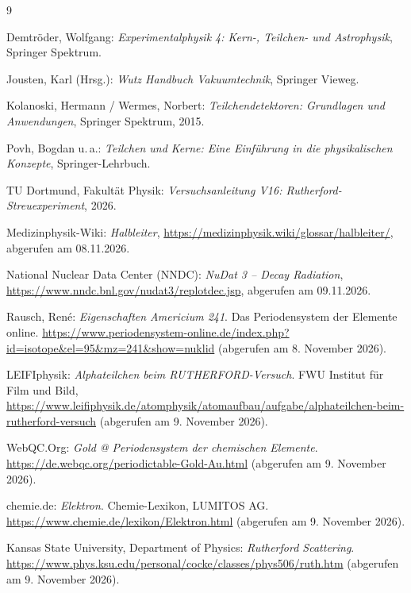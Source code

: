 \newpage

\begin{thebibliography}{9}

Demtröder, Wolfgang: \emph{Experimentalphysik 4: Kern-, Teilchen- und Astrophysik}, Springer Spektrum.

Jousten, Karl (Hrsg.): \emph{Wutz Handbuch Vakuumtechnik}, Springer Vieweg.

Kolanoski, Hermann / Wermes, Norbert: \emph{Teilchendetektoren: Grundlagen und Anwendungen}, Springer Spektrum, 2015.

Povh, Bogdan u.\,a.: \emph{Teilchen und Kerne: Eine Einführung in die physikalischen Konzepte}, Springer-Lehrbuch.

TU Dortmund, Fakultät Physik: \emph{Versuchsanleitung V16: Rutherford-Streuexperiment}, 2026.

Medizinphysik-Wiki: \emph{Halbleiter},
\url{https://medizinphysik.wiki/glossar/halbleiter/},
abgerufen am 08.11.2026.

National Nuclear Data Center (NNDC): \emph{NuDat 3 -- Decay Radiation},
\url{https://www.nndc.bnl.gov/nudat3/replotdec.jsp},
abgerufen am 09.11.2026.

Rausch, René: \emph{Eigenschaften Americium 241}.
Das Periodensystem der Elemente online.
\url{https://www.periodensystem-online.de/index.php?id=isotope&el=95&mz=241&show=nuklid}
(abgerufen am 8. November 2026).

LEIFIphysik: \emph{Alphateilchen beim RUTHERFORD-Versuch}.
FWU Institut für Film und Bild,
\url{https://www.leifiphysik.de/atomphysik/atomaufbau/aufgabe/alphateilchen-beim-rutherford-versuch}
(abgerufen am 9. November 2026).

WebQC.Org: \emph{Gold @ Periodensystem der chemischen Elemente}.
\url{https://de.webqc.org/periodictable-Gold-Au.html}
(abgerufen am 9. November 2026).

chemie.de: \emph{Elektron}. Chemie-Lexikon, LUMITOS AG.
\url{https://www.chemie.de/lexikon/Elektron.html}
(abgerufen am 9. November 2026).

Kansas State University, Department of Physics:
\emph{Rutherford Scattering}.
\url{https://www.phys.ksu.edu/personal/cocke/classes/phys506/ruth.htm}
(abgerufen am 9. November 2026).

\end{thebibliography}

